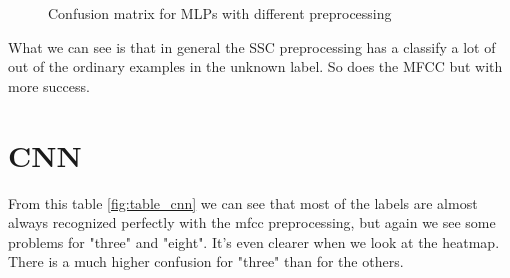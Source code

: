 \begin{figure}[h!]

    \centering
    \qquad
    \caption{Confusion matrix for MLPs with different preprocessing}
    \label{fig:confusion_mlp}

\end{figure}

What we can see is that in general the SSC preprocessing has a classify a lot of out of the ordinary examples in the unknown label. So does the MFCC but with more success.



\section{CNN}




From this table \ref{fig:table_cnn} we can see that most of the labels are almost always recognized perfectly with the mfcc preprocessing, but again we see some problems for "three" and "eight". It's even clearer when we look at the heatmap. There is a much higher confusion for "three" than for the others.



